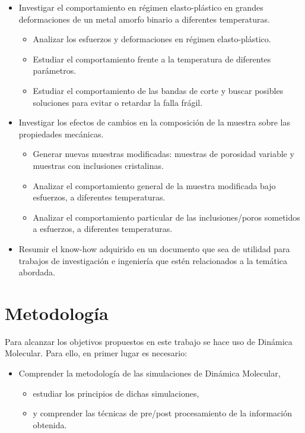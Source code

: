 \begin{itemize}
 \item Investigar el comportamiento en régimen elasto-plástico en grandes deformaciones de un metal amorfo binario a diferentes temperaturas.
 \begin{itemize}
  \item Analizar los esfuerzos y deformaciones en régimen elasto-plástico.
  \item Estudiar el comportamiento frente a la temperatura de diferentes parámetros.
  \item Estudiar el comportamiento de las bandas de corte y buscar posibles soluciones para evitar o retardar la falla frágil.
 \end{itemize}
 \item Investigar los efectos de cambios en la composición de la muestra sobre las propiedades mecánicas.
 \begin{itemize}
  \item Generar nuevas muestras modificadas: muestras de porosidad variable y muestras con inclusiones cristalinas.
  \item Analizar el comportamiento general de la muestra modificada bajo esfuerzos, a diferentes temperaturas.
  \item Analizar el comportamiento particular de las inclusiones/poros sometidos a esfuerzos, a diferentes temperaturas.
 \end{itemize}
 \item Resumir el know-how adquirido en un documento que sea de utilidad para trabajos de investigación e ingeniería que estén relacionados a la temática abordada.
\end{itemize}


\section{Metodología}
\label{S1_5}

Para alcanzar los objetivos propuestos en este trabajo se hace uso de Dinámica Molecular. Para ello, en primer lugar es necesario:

\begin{itemize}
 \item Comprender la metodología de las simulaciones de Dinámica Molecular,
 \begin{itemize}
  \item estudiar los principios de dichas simulaciones,
  \item y comprender las técnicas de pre/post procesamiento de la información obtenida.
 \end{itemize}
\end{itemize}

